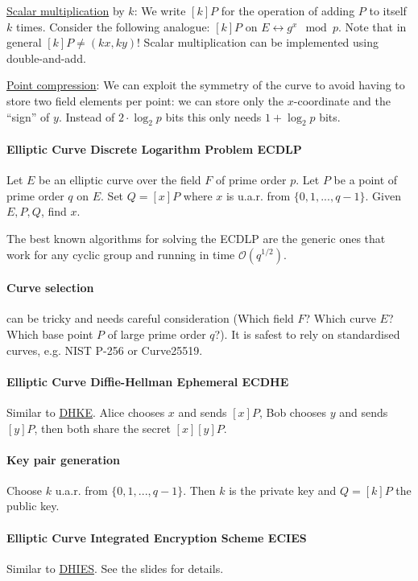 \underline{Scalar multiplication} by $k$:
We write $[k]P$ for the operation of adding $P$ to itself $k$ times.
Consider the following analogue: $[k]P \text{ on } E \leftrightarrow g^x \mod p$.
Note that in general $[k]P \neq (kx, ky)$!
Scalar multiplication can be implemented using double-and-add.

\underline{Point compression}:
We can exploit the symmetry of the curve to avoid having to store two field elements per point:
we can store only the $x$-coordinate and the ``sign'' of $y$.
Instead of $2\cdot \log_2 p$ bits this only needs $1 + \log_2 p$ bits.

\paragraph{Elliptic Curve Discrete Logarithm Problem ECDLP}
Let $E$ be an elliptic curve over the field $F$ of prime order $p$.
Let $P$ be a point of prime order $q$ on $E$.
Set $Q = [x]P$ where $x$ is u.a.r. from $\{ 0, 1, ..., q-1 \}$.
Given $E, P, Q$, find $x$.

The best known algorithms for solving the ECDLP are the generic ones that work for any cyclic group and running in time $\mathcal{O}(q^{1/2})$.

\paragraph{Curve selection}
can be tricky and needs careful consideration (Which field $F$? Which curve $E$?
Which base point $P$ of large prime order $q$?).
It is safest to rely on standardised curves, e.g. NIST P-256 or Curve25519.

\paragraph{Elliptic Curve Diffie-Hellman Ephemeral ECDHE}
Similar to \hyperlink{dhke}{DHKE}.
Alice chooses $x$ and sends $[x]P$, Bob chooses $y$ and sends $[y]P$,
then both share the secret $[x][y]P$.

\paragraph{Key pair generation}
Choose $k$ u.a.r. from $\{ 0, 1, ..., q-1 \}$.
Then $k$ is the private key and $Q=[k]P$ the public key.

\paragraph{Elliptic Curve Integrated Encryption Scheme ECIES}
Similar to \hyperlink{dhies}{DHIES}.
See the slides for details.

